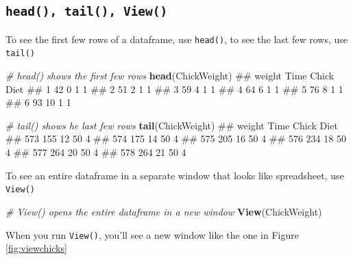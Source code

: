 \documentclass[]{book}
\newenvironment{Shaded}{\begin{snugshade}}{\end{snugshade}}
\newcommand{\KeywordTok}[1]{\textcolor[rgb]{0.13,0.29,0.53}{\textbf{{#1}}}}
\newcommand{\CommentTok}[1]{\textcolor[rgb]{0.56,0.35,0.01}{\textit{{#1}}}}
\newcommand{\NormalTok}[1]{{#1}}
\theoremstyle{definition}
\theoremstyle{definition}
\theoremstyle{remark}
\begin{document}
\subsection{\texorpdfstring{\texttt{head(),\ tail(),\ View()}}{head(), tail(), View()}}\label{head-tail-view}

To see the first few rows of a dataframe, use \texttt{head()}, to see
the last few rows, use \texttt{tail()}

\begin{Shaded}
\begin{Highlighting}[]
\CommentTok{# head() shows the first few rows}
\KeywordTok{head}\NormalTok{(ChickWeight)}
\NormalTok{##   weight Time Chick Diet}
\NormalTok{## 1     42    0     1    1}
\NormalTok{## 2     51    2     1    1}
\NormalTok{## 3     59    4     1    1}
\NormalTok{## 4     64    6     1    1}
\NormalTok{## 5     76    8     1    1}
\NormalTok{## 6     93   10     1    1}

\CommentTok{# tail() shows he last few rows}
\KeywordTok{tail}\NormalTok{(ChickWeight)}
\NormalTok{##     weight Time Chick Diet}
\NormalTok{## 573    155   12    50    4}
\NormalTok{## 574    175   14    50    4}
\NormalTok{## 575    205   16    50    4}
\NormalTok{## 576    234   18    50    4}
\NormalTok{## 577    264   20    50    4}
\NormalTok{## 578    264   21    50    4}
\end{Highlighting}
\end{Shaded}

To see an entire dataframe in a separate window that looks like
spreadsheet, use \texttt{View()}

\begin{Shaded}
\begin{Highlighting}[]
\CommentTok{# View() opens the entire dataframe in a new window}
\KeywordTok{View}\NormalTok{(ChickWeight)}
\end{Highlighting}
\end{Shaded}

When you run \texttt{View()}, you'll see a new window like the one in
Figure \ref{fig:viewchicks}
\end{document}
